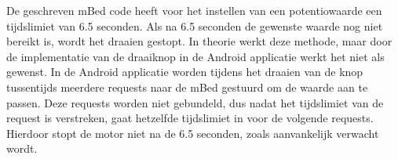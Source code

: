 \documentclass[a4paper,12pt]{article}
\begin{document}
De geschreven mBed code heeft voor het instellen van een potentiowaarde een tijdslimiet van 6.5 seconden. Als na 6.5 seconden de gewenste waarde nog niet bereikt is, wordt het draaien gestopt. In theorie werkt deze methode, maar door de implementatie van de draaiknop in de Android applicatie werkt het niet als gewenst. In de Android applicatie worden tijdens het draaien van de knop tussentijds meerdere requests naar de mBed gestuurd om de waarde aan te passen. Deze requests worden niet gebundeld, dus nadat het tijdslimiet van de request is verstreken, gaat hetzelfde tijdslimiet in voor de volgende requests. Hierdoor stopt de motor niet na de 6.5 seconden, zoals aanvankelijk verwacht wordt.







\end{document}
